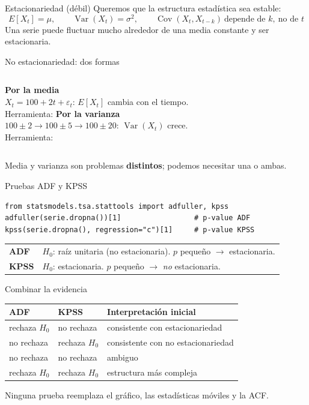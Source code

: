 \begin{frame}{Estacionariedad (débil)}
Queremos que la estructura estadística sea estable:
\[
E[X_t]=\mu,\qquad \operatorname{Var}(X_t)=\sigma^2,\qquad
\operatorname{Cov}(X_t,X_{t-k})\ \text{depende de }k,\ \text{no de }t
\]
Una serie puede fluctuar mucho alrededor de una media constante y ser estacionaria.
\end{frame}

\begin{frame}{No estacionariedad: dos formas}
\begin{columns}[T]
\textbf{Por la media}\\
$X_t=100+2t+\varepsilon_t$: $E[X_t]$ cambia con el tiempo.\\
Herramienta: 
\textbf{Por la varianza}\\
$100\pm2 \to 100\pm5 \to 100\pm20$: $\operatorname{Var}(X_t)$ crece.\\
Herramienta: 
\end{columns}
\vfill
Media y varianza son problemas \textbf{distintos}; podemos necesitar una o ambas.
\end{frame}

\begin{frame}[fragile]{Pruebas ADF y KPSS}
\begin{lstlisting}
from statsmodels.tsa.stattools import adfuller, kpss
adfuller(serie.dropna())[1]                 # p-value ADF
kpss(serie.dropna(), regression="c")[1]     # p-value KPSS
\end{lstlisting}
\begin{center}
\begin{tabular}{ll}
\toprule
\textbf{ADF} & $H_0$: raíz unitaria (no estacionaria). $p$ pequeño $\rightarrow$ estacionaria.\\
\textbf{KPSS} & $H_0$: estacionaria. $p$ pequeño $\rightarrow$ \emph{no} estacionaria.\\
\bottomrule
\end{tabular}
\end{center}
\end{frame}

\begin{frame}{Combinar la evidencia}
\begin{center}
\begin{tabular}{lll}
\toprule
ADF & KPSS & Interpretación inicial\\
\midrule
rechaza $H_0$ & no rechaza & consistente con estacionariedad\\
no rechaza & rechaza $H_0$ & consistente con no estacionariedad\\
no rechaza & no rechaza & ambiguo\\
rechaza $H_0$ & rechaza $H_0$ & estructura más compleja\\
\bottomrule
\end{tabular}
\end{center}
\vfill
Ninguna prueba reemplaza el gráfico, las estadísticas móviles y la ACF.
\end{frame}

